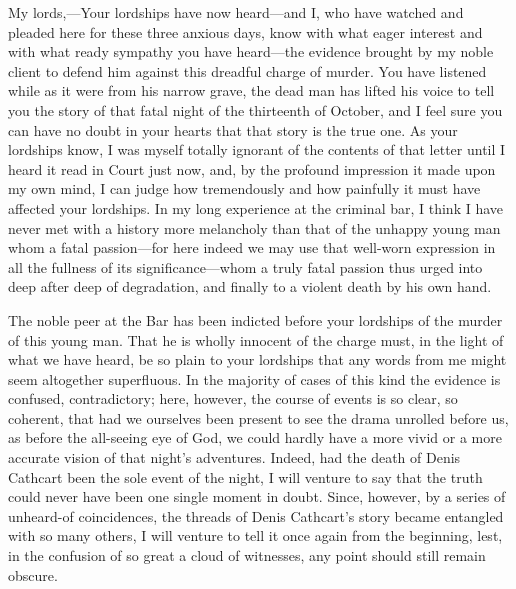 \begin{dialogue}
 My lords,\allowbreak---\allowbreak Your lordships have now heard\allowbreak---\allowbreak and I, who have watched and pleaded here for these three anxious days, know with what eager interest and with what ready sympathy you have heard\allowbreak---\allowbreak the evidence brought by my noble client to defend him against this dreadful charge of murder. You have listened while as it were from his narrow grave, the dead man has lifted his voice to tell you the story of that fatal night of the thirteenth of October, and I feel sure you can have no doubt in your hearts that that story is the true one. As your lordships know, I was myself totally ignorant of the contents of that letter until I heard it read in Court just now, and, by the profound impression it made upon my own mind, I can judge how tremendously and how painfully it must have affected your lordships. In my long experience at the criminal bar, I think I have never met with a history more melancholy than that of the unhappy young man whom a fatal passion\allowbreak---\allowbreak for here indeed we may use that well-worn expression in all the fullness of its significance\allowbreak---\allowbreak whom a truly fatal passion thus urged into deep after deep of degradation, and finally to a violent death by his own hand.

\smallskip 

The noble peer at the Bar has been indicted before your lordships of the murder of this young man. That he is wholly innocent of the charge must, in the light of what we have heard, be so plain to your lordships that any words from me might seem altogether superfluous. In the majority of cases of this kind the evidence is confused, contradictory; here, however, the course of events is so clear, so coherent, that had we ourselves been present to see the drama unrolled before us, as before the all-seeing eye of God, we could hardly have a more vivid or a more accurate vision of that night's adventures. Indeed, had the death of Denis Cathcart been the sole event of the night, I will venture to say that the truth could never have been one single moment in doubt. Since, however, by a series of unheard-of coincidences, the threads of Denis Cathcart's story became entangled with so many others, I will venture to tell it once again from the beginning, lest, in the confusion of so great a cloud of witnesses, any point should still remain obscure.

\smallskip 


\end{dialogue}
